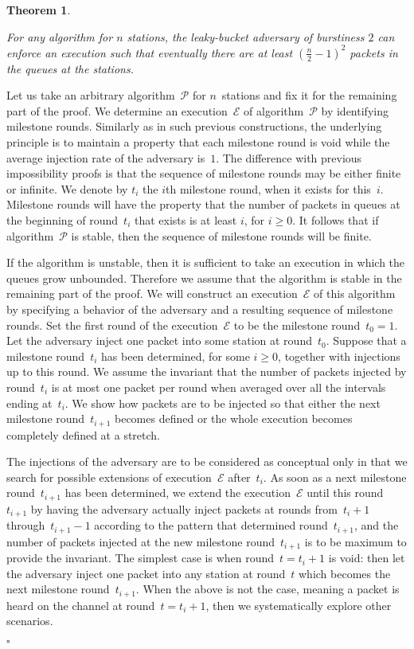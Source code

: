 \documentclass[11pt]{article}
\newcommand{\cE}{\mathcal{E}}
\newcommand{\cP}{\mathcal{P}}
\newcommand{\qed}{\hfill $\square$ \smallbreak}
\newenvironment{proof}{\noindent{\bf Proof:}}{\qed}
\newtheorem{theorem}{Theorem}
\begin{document}
\begin{theorem}
\label{thm:lower-bound-n-squared}

For any algorithm for $n$ stations, the leaky-bucket adversary of burstiness $2$ can enforce an execution such that eventually there are at least $\left(\frac{n}{2}-1\right)^2$ packets in the queues at the stations.
\end{theorem}

\begin{proof}
Let us take an arbitrary algorithm~$\cP$ for $n$~stations and fix it for the remaining part of the proof.
We determine an execution~$\cE$ of algorithm~$\cP$ by identifying milestone rounds.
Similarly as in such previous constructions, the underlying principle is to maintain a property  that each milestone round is void while the average injection rate of the adversary is~$1$.
The difference with previous impossibility proofs is that the sequence of milestone rounds may be either finite or infinite.
We  denote by $t_i$ the $i$th milestone round, when it exists for this~$i$.
Milestone rounds will have the property that the number of packets in queues at the beginning of round~$t_i$ that exists is at least $i$, for $i\ge 0$.
It follows that if algorithm~$\cP$ is stable, then the sequence of milestone rounds will be finite.

If the algorithm is unstable, then it is sufficient to take an execution in which the queues grow unbounded.
Therefore we assume that the algorithm is stable in the remaining part of the proof.
We will construct an execution~$\cE$ of this algorithm by specifying a behavior of the adversary and a resulting sequence of milestone rounds.
Set the first round of the execution~$\cE$ to be the milestone round~$t_0=1$.
Let the adversary inject one packet into some station at round~$t_0$.
Suppose that a milestone round~$t_i$ has been determined, for some $i\ge 0$, together with injections up to this round.
We assume the invariant that the number of packets injected by round~$t_i$ is at most one packet per round when averaged over all the intervals ending at~$t_i$. 
We show how packets are to be injected so that either the next milestone round~$t_{i+1}$  becomes defined or the whole execution becomes completely defined at a stretch.

The injections of the adversary are to be considered as conceptual only in that we search for possible extensions of execution~$\cE$ after~$t_i$.
As soon as a next milestone round~$t_{i+1}$ has been determined, we extend the execution~$\cE$ until this round~$t_{i+1}$ by having the adversary actually inject packets at rounds from~$t_i+1$ through~$t_{i+1}-1$ according to the pattern that determined round~$t_{i+1}$, and the number of packets injected at the new milestone round~$t_{i+1}$ is to be maximum to provide the invariant.
The simplest case is when round~$t=t_i+1$ is void: then let the adversary inject one packet into any station at round~$t$ which becomes the next milestone round~$t_{i+1}$.
When the above is not the case, meaning a packet is heard on the channel at round~$t=t_i+1$, then we systematically explore other scenarios.


\end{proof}
\end{document}
